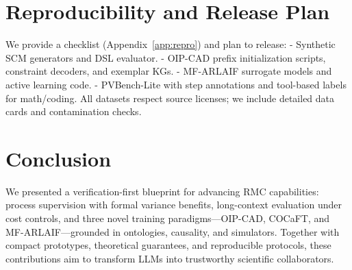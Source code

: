 \documentclass{article}
\begin{document}
\section{Reproducibility and Release Plan}
We provide a checklist (Appendix~\ref{app:repro}) and plan to release:
- Synthetic SCM generators and DSL evaluator.
- OIP-CAD prefix initialization scripts, constraint decoders, and exemplar KGs.
- MF-ARLAIF surrogate models and active learning code.
- PVBench-Lite with step annotations and tool-based labels for math/coding.
All datasets respect source licenses; we include detailed data cards and contamination checks.

\section{Conclusion}
We presented a verification-first blueprint for advancing RMC capabilities: process supervision with formal variance benefits, long-context evaluation under cost controls, and three novel training paradigms—OIP-CAD, COCaFT, and MF-ARLAIF—grounded in ontologies, causality, and simulators. Together with compact prototypes, theoretical guarantees, and reproducible protocols, these contributions aim to transform LLMs into trustworthy scientific collaborators.
\end{document}
